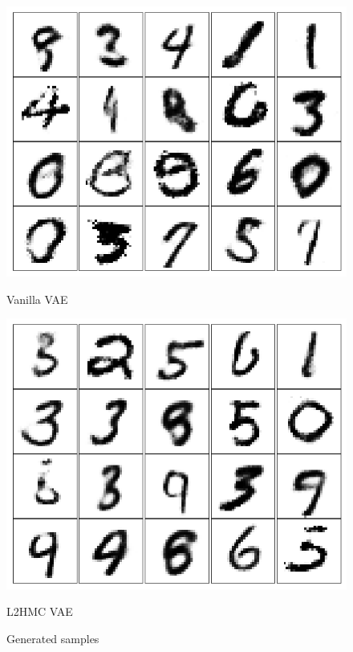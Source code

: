 \documentclass{article}
\begin{document}
\begin{figure}[H]
  \centering
  \begin{minipage}[b]{0.45\linewidth}
    \includegraphics[width=\linewidth]{vanilla_vae.png}
    \caption{Vanilla VAE}
  \end{minipage}
  \begin{minipage}[b]{0.45\linewidth}
    \includegraphics[width=\linewidth]{l2hmc_vae.png}
    \caption{L2HMC VAE}
  \end{minipage}
  \label{fig:vae}
  \caption{Generated samples}
\end{figure}
\end{document}
